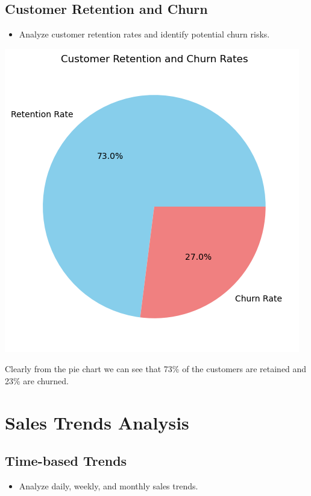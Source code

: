 \documentclass{article}
\begin{document}
    \subsection{Customer Retention and Churn}
    \begin{itemize}
        \item Analyze customer retention rates and identify potential churn risks.
    \end{itemize}
    \begin{tcolorbox}[colback=blue!5!white, colframe=green!70!black, title= Customer Retention and Churn Rate , fonttitle=\bfseries\Large]
        \begin{center}
            \includegraphics[width=1\columnwidth]{images/crc.png}
        \end{center}
        Clearly from the pie chart we can see that 73\% of the customers are retained and 23\% are churned.\\
    \end{tcolorbox}

\section{Sales Trends Analysis}
    \subsection{Time-based Trends}
    \begin{itemize}
        \item Analyze daily, weekly, and monthly sales trends.
    \end{itemize}
   
\end{document}
